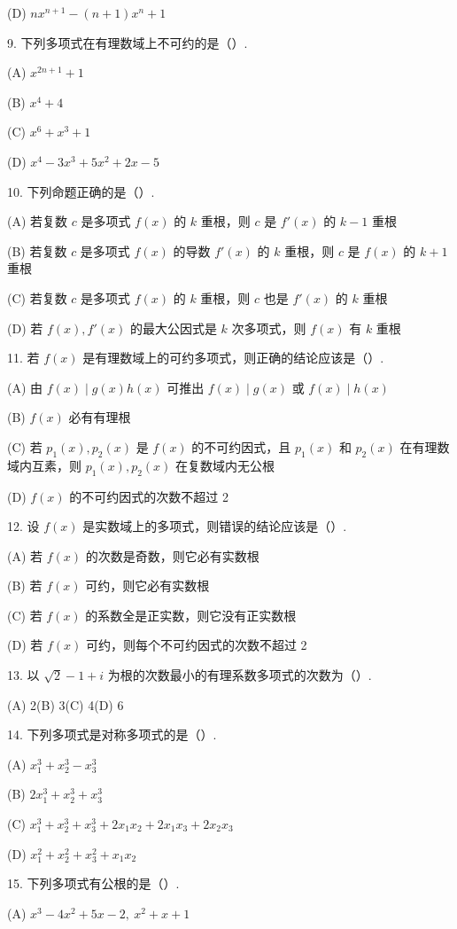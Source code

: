 \documentclass[UTF8, 12pt, fontset=fandol, oneside]{ctexart}
\begin{document}
(D) $nx^{n+1}-(n+1)x^n+1$

9. 下列多项式在有理数域上不可约的是（\quad ）.

(A) $x^{2n+1}+1$

(B) $x^4+4$

(C) $x^6+x^3+1$

(D) $x^4-3x^3+5x^2+2x-5$

10. 下列命题正确的是（\quad ）.

(A) 若复数 $c$ 是多项式 $f(x)$ 的 $k$ 重根，则 $c$ 是 $f'(x)$ 的 $k-1$ 重根

(B) 若复数 $c$ 是多项式 $f(x)$ 的导数 $f'(x)$ 的 $k$ 重根，则 $c$ 是 $f(x)$ 的 $k+1$ 重根

(C) 若复数 $c$ 是多项式 $f(x)$ 的 $k$ 重根，则 $c$ 也是 $f'(x)$ 的 $k$ 重根

(D) 若 $f(x),f'(x)$ 的最大公因式是 $k$ 次多项式，则 $f(x)$ 有 $k$ 重根

11. 若 $f(x)$ 是有理数域上的可约多项式，则正确的结论应该是（\quad ）.

(A) 由 $f(x)\mid g(x)h(x)$ 可推出 $f(x)\mid g(x)$ 或 $f(x)\mid h(x)$

(B) $f(x)$ 必有有理根

(C) 若 $p_1(x),p_2(x)$ 是 $f(x)$ 的不可约因式，且 $p_1(x)$ 和 $p_2(x)$ 在有理数域内互素，则 $p_1(x),p_2(x)$ 在复数域内无公根

(D) $f(x)$ 的不可约因式的次数不超过 2

12. 设 $f(x)$ 是实数域上的多项式，则错误的结论应该是（\quad ）.

(A) 若 $f(x)$ 的次数是奇数，则它必有实数根

(B) 若 $f(x)$ 可约，则它必有实数根

(C) 若 $f(x)$ 的系数全是正实数，则它没有正实数根

(D) 若 $f(x)$ 可约，则每个不可约因式的次数不超过 2

13. 以 $\sqrt{2}-1+i$ 为根的次数最小的有理系数多项式的次数为（\quad ）.

(A) 2\quad (B) 3\quad (C) 4\quad (D) 6

14. 下列多项式是对称多项式的是（\quad ）.

(A) $x_1^3+x_2^3-x_3^3$

(B) $2x_1^3+x_2^3+x_3^3$

(C) $x_1^3+x_2^3+x_3^3+2x_1x_2+2x_1x_3+2x_2x_3$

(D) $x_1^2+x_2^2+x_3^2+x_1x_2$

15. 下列多项式有公根的是（\quad ）.

(A) $x^3-4x^2+5x-2,\ x^2+x+1$
\end{document}
